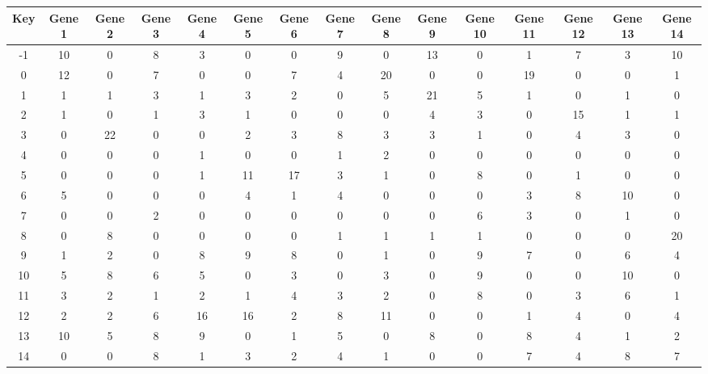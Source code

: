 \begin{tabular}{|c|c|c|c|c|c|c|c|c|c|c|c|c|c|c|}
\hline
Key & Gene 1 & Gene 2 & Gene 3 & Gene 4 & Gene 5 & Gene 6 & Gene 7 & Gene 8 & Gene 9 & Gene 10 & Gene 11 & Gene 12 & Gene 13 & Gene 14 \\
\hline
-1 & 10 & 0 & 8 & 3 & 0 & 0 & 9 & 0 & 13 & 0 & 1 & 7 & 3 & 10 \\
0 & 12 & 0 & 7 & 0 & 0 & 7 & 4 & 20 & 0 & 0 & 19 & 0 & 0 & 1 \\
1 & 1 & 1 & 3 & 1 & 3 & 2 & 0 & 5 & 21 & 5 & 1 & 0 & 1 & 0 \\
2 & 1 & 0 & 1 & 3 & 1 & 0 & 0 & 0 & 4 & 3 & 0 & 15 & 1 & 1 \\
3 & 0 & 22 & 0 & 0 & 2 & 3 & 8 & 3 & 3 & 1 & 0 & 4 & 3 & 0 \\
4 & 0 & 0 & 0 & 1 & 0 & 0 & 1 & 2 & 0 & 0 & 0 & 0 & 0 & 0 \\
5 & 0 & 0 & 0 & 1 & 11 & 17 & 3 & 1 & 0 & 8 & 0 & 1 & 0 & 0 \\
6 & 5 & 0 & 0 & 0 & 4 & 1 & 4 & 0 & 0 & 0 & 3 & 8 & 10 & 0 \\
7 & 0 & 0 & 2 & 0 & 0 & 0 & 0 & 0 & 0 & 6 & 3 & 0 & 1 & 0 \\
8 & 0 & 8 & 0 & 0 & 0 & 0 & 1 & 1 & 1 & 1 & 0 & 0 & 0 & 20 \\
9 & 1 & 2 & 0 & 8 & 9 & 8 & 0 & 1 & 0 & 9 & 7 & 0 & 6 & 4 \\
10 & 5 & 8 & 6 & 5 & 0 & 3 & 0 & 3 & 0 & 9 & 0 & 0 & 10 & 0 \\
11 & 3 & 2 & 1 & 2 & 1 & 4 & 3 & 2 & 0 & 8 & 0 & 3 & 6 & 1 \\
12 & 2 & 2 & 6 & 16 & 16 & 2 & 8 & 11 & 0 & 0 & 1 & 4 & 0 & 4 \\
13 & 10 & 5 & 8 & 9 & 0 & 1 & 5 & 0 & 8 & 0 & 8 & 4 & 1 & 2 \\
14 & 0 & 0 & 8 & 1 & 3 & 2 & 4 & 1 & 0 & 0 & 7 & 4 & 8 & 7 \\
\hline
\end{tabular}